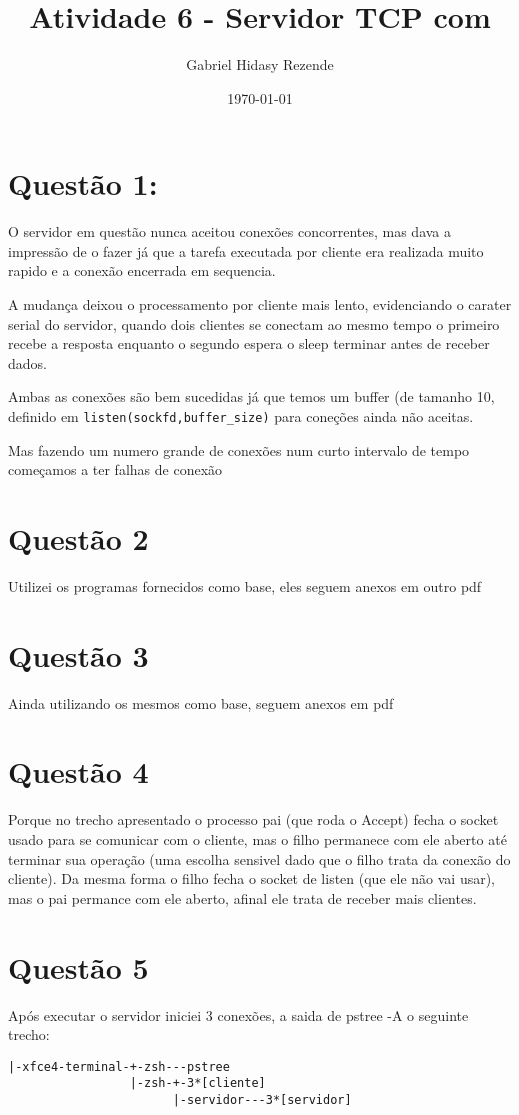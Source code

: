 \documentclass[11pt]{article}
\author{Gabriel Hidasy Rezende}
\date{\today}
\title{Atividade 6 - Servidor TCP com}
\begin{document}
\maketitle


\section{Questão 1:}
\label{sec-1}
O servidor em questão nunca aceitou conexões concorrentes, mas dava a
impressão de o fazer já que a tarefa executada por cliente era
realizada muito rapido e a conexão encerrada em sequencia. 

A mudança deixou o processamento por cliente mais lento, evidenciando
o carater serial do servidor, quando dois clientes se conectam ao
mesmo tempo o primeiro recebe a resposta enquanto o segundo espera o
sleep terminar antes de receber dados.

Ambas as conexões são bem sucedidas já que temos um buffer (de tamanho
10, definido em \texttt{listen(sockfd,buffer\_size)} para coneções ainda não
aceitas.

Mas fazendo um numero grande de conexões num curto intervalo de tempo
começamos a ter falhas de conexão

\section{Questão 2}
\label{sec-2}
Utilizei os programas fornecidos como base, eles seguem anexos em
outro pdf
\section{Questão 3}
\label{sec-3}
Ainda utilizando os mesmos como base, seguem anexos em pdf
\section{Questão 4}
\label{sec-4}
Porque no trecho apresentado o processo pai (que roda o Accept)
fecha o socket usado para se comunicar com o cliente, mas o filho
permanece com ele aberto até terminar sua operação (uma escolha
sensivel dado que o filho trata da conexão do cliente). Da mesma
forma o filho fecha o socket de listen (que ele não vai usar), mas o
pai permance com ele aberto, afinal ele trata de receber mais
clientes.
\section{Questão 5}
\label{sec-5}
Após executar o servidor iniciei 3 conexões, a saida de pstree -A o
seguinte trecho:
\begin{verbatim}
|-xfce4-terminal-+-zsh---pstree
                 |-zsh-+-3*[cliente]
                       |-servidor---3*[servidor]

\end{verbatim}
\end{document}
